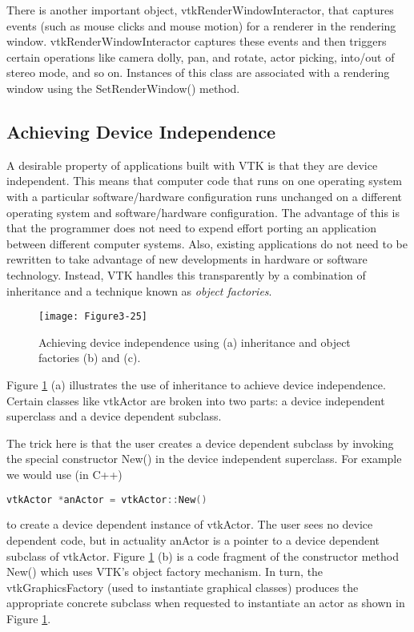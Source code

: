 There is another important object, vtkRenderWindowInteractor, that captures events (such as mouse clicks and mouse motion) for a renderer in the rendering window. vtkRenderWindowInteractor captures these events and then triggers certain operations like camera dolly, pan, and rotate, actor picking, into/out of stereo mode, and so on. Instances of this class are associated with a rendering window using the SetRenderWindow() method.

\subsection{Achieving Device Independence}
\label{sec:adi}
A desirable property of applications built with VTK is that they are device independent. This means that computer code that runs on one operating system with a particular software/hardware configuration runs unchanged on a different operating system and software/hardware configuration. The advantage of this is that the programmer does not need to expend effort porting an application between different computer systems. Also, existing applications do not need to be rewritten to take advantage of new developments in hardware or software technology. Instead, VTK handles this transparently by a combination of inheritance and a technique known as \emph{object factories}.

\begin{figure}[!htb]
  \centering
  \texttt{[image: Figure3-25]}\\
  \caption{Achieving device independence using (a) inheritance and object factories (b) and (c).}\label{fig:Figure3-25}
\end{figure}

Figure \ref{fig:Figure3-25} (a) illustrates the use of inheritance to achieve device independence. Certain classes like vtkActor are broken into two parts: a device independent superclass and a device dependent subclass.

\begin{samepage}
The trick here is that the user creates a device dependent
subclass by invoking the special constructor New() in the device independent superclass. For example we would use (in C++)
\begin{lstlisting}[language=C++]
vtkActor *anActor = vtkActor::New()
\end{lstlisting}
\noindent to create a device dependent instance of vtkActor. The user sees no device dependent code, but in actuality anActor is a pointer to a device dependent subclass of vtkActor. Figure \ref{fig:Figure3-25} (b) is a code fragment of the constructor method New() which uses VTK's object factory mechanism. In turn, the vtkGraphicsFactory (used to instantiate graphical classes) produces the appropriate concrete subclass when requested to instantiate an actor as shown in Figure \ref{fig:Figure3-25}.
\end{samepage}

